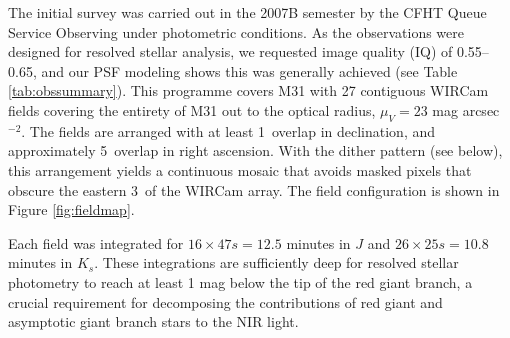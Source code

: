 \documentclass[iop]{emulateapj}
\begin{document}





The initial survey was carried out in the 2007B semester by the CFHT Queue Service Observing under photometric conditions. As the observations were designed for resolved stellar analysis, we requested image quality (IQ) of 0.55\arcsec--0.65\arcsec, and our PSF modeling shows this was generally achieved (see Table \ref{tab:obssummary}). This programme covers M31 with 27 contiguous WIRCam fields covering the entirety of M31 out to the optical radius, $\mu_V=23$ mag arcsec$^{-2}$. The fields are arranged with at least 1\arcmin\ overlap in declination, and approximately 5\arcmin\ overlap in right ascension.
With the dither pattern (see below), this arrangement yields a continuous mosaic that avoids masked pixels that obscure the eastern 3\arcmin\ of the WIRCam array. The field configuration is shown in Figure \ref{fig:fieldmap}.

Each field was integrated for $16\times 47 s = 12.5$ minutes in $J$ and $26\times 25 s = 10.8$ minutes in $K_s$. These integrations are sufficiently deep for resolved stellar photometry to reach at least 1 mag below the tip of the red giant branch, a crucial requirement for decomposing the contributions of red giant and asymptotic giant branch stars to the NIR light.
\end{document}
